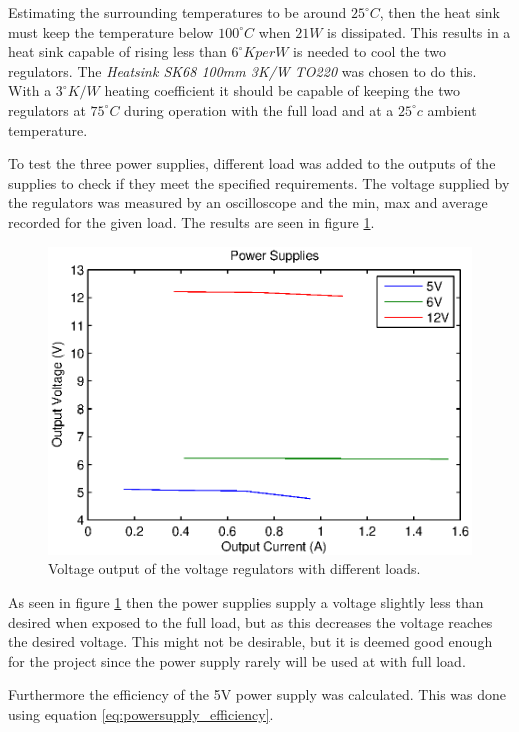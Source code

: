 Estimating the surrounding temperatures to be around $25^{\circ} C$, then the heat sink must keep the temperature below $100^{\circ} C$ when $21W$ is dissipated.
This results in a heat sink capable of rising less than $6 ^{\circ}K per W$ is needed to cool the two regulators.
The \textit{Heatsink SK68 100mm 3K/W TO220} was chosen to do this.
With a $3^{\circ}K/W$ heating coefficient it should be capable of keeping the two regulators at $75^{\circ}C$ during operation with the full load and at a $25^{\circ}c$ ambient temperature.



To test the three power supplies, different load was added to the outputs of the supplies to check if they meet the specified requirements.
The voltage supplied by the regulators was measured by an oscilloscope and the min, max and average recorded for the given load.
The results are seen in figure \ref{fig:voltagesupply}.

\begin{figure}[H]
\centering
\includegraphics[width = 0.9 \textwidth]{images/powersupply_output}
\caption{Voltage output of the voltage regulators with different loads.}
\label{fig:voltagesupply}
\end{figure}

As seen in figure \ref{fig:voltagesupply} then the power supplies supply a voltage slightly less than desired when exposed to the full load, but as this decreases the voltage reaches the desired voltage.
This might not be desirable, but it is deemed good enough for the project since the power supply rarely will be used at with full load.


Furthermore the efficiency of the 5V power supply was calculated.
This was done using equation \ref{eq:powersupply_efficiency}.

